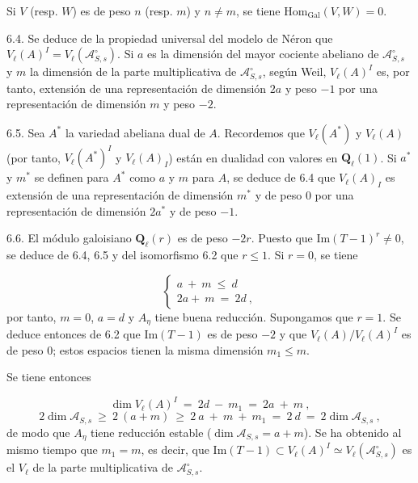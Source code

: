
Si $V$ (resp. $W$) es de peso $n$ (resp. $m$) y $n \neq m$, se tiene $\mathrm{Hom}_{\mathrm{Gal}}(V,W) = 0$.

6.4. Se deduce de la propiedad universal del modelo de Néron que $V_{\ell}(A)^{I} = V_{\ell}(\mathcal{A}^{\circ}_{S,s})$. Si $a$ es la dimensión del mayor cociente abeliano de $\mathcal{A}^{\circ}_{S,s}$ y $m$ la dimensión de la parte multiplicativa de $\mathcal{A}^{\circ}_{S,s}$, según Weil, $V_{\ell}(A)^{I}$ es, por tanto, extensión de una representación de dimensión $2a$ y peso $-1$ por una representación de dimensión $m$ y peso $-2$.

6.5. Sea $A^{*}$ la variedad abeliana dual de $A$. Recordemos que $V_{\ell}(A^{*})$ y $V_{\ell}(A)$ (por tanto, $V_{\ell}(A^{*})^{I}$ y $V_{\ell}(A)_{I}$) están en dualidad con valores en $\mathbf{Q}_{\ell}(1)$. Si $a^{*}$ y $m^{*}$ se definen para $A^{*}$ como $a$ y $m$ para $A$, se deduce de 6.4 que $V_{\ell}(A)_{I}$ es extensión de una representación de dimensión $m^{*}$ y de peso 0 por una representación de dimensión $2a^{*}$ y de peso $-1$.

6.6. El módulo galoisiano $\mathbf{Q}_{\ell}(r)$ es de peso $-2r$. Puesto que $\mathrm{Im}(T-1)^{r} \neq 0$, se deduce de 6.4, 6.5 y del isomorfismo 6.2 que $r \leqslant 1$. Si $r = 0$, se tiene

\begin{equation*}
\left\{
\begin{array}{l}
a \ + \ m \ \leqslant \ d \\[2ex]
2a + \ m \ = \ 2d \ ,
\end{array}
\right.
\end{equation*}
por tanto, $m = 0$, $a = d$ y $A_{\eta}$ tiene buena reducción. Supongamos que $r = 1$. Se deduce entonces de 6.2 que $\mathrm{Im}(T-1)$ es de peso $-2$ y que $V_{\ell}(A)/V_{\ell}(A)^{I}$ es de peso 0; estos espacios tienen la misma dimensión $m_{1} \leqslant m$.

Se tiene entonces

\begin{equation*}
\dim V_{\ell}(A)^{I} \ = \ 2d \ - \ m_{1} \ = \ 2a \ + \ m \ ,
\end{equation*}
\begin{equation*}
2 \dim \mathcal{A}_{S,s} \ \geqslant \ 2 \ (a + m) \ \geqslant \ 2 \ a \ + \ m \ + \ m_{1} \ = \ 2 \ d \ = \ 2 \dim \mathcal{A}_{S,s} \ ,
\end{equation*}
de modo que $A_{\eta}$ tiene reducción estable ($\dim \mathcal{A}_{S,s} = a + m$). Se ha obtenido al mismo tiempo que $m_{1} = m$, es decir, que $\mathrm{Im}(T-1) \subset V_{\ell}(A)^{I} \simeq V_{\ell}(\mathcal{A}^{\circ}_{S,s})$ es el $V_{\ell}$ de la parte multiplicativa de $\mathcal{A}^{\circ}_{S,s}$.

